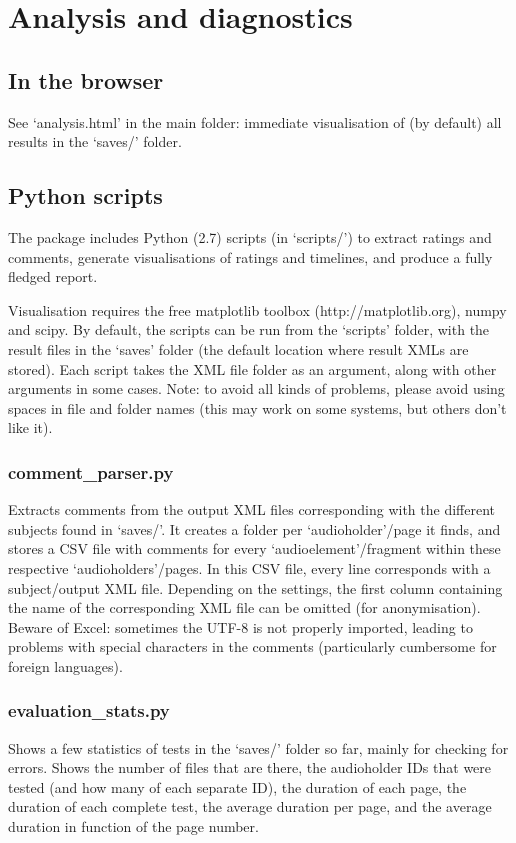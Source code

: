 \documentclass[11pt, oneside]{article}   	%
\begin{document}
\clearpage
\section{Analysis and diagnostics}
	\subsection{In the browser}
		See `analysis.html' in the main folder: immediate visualisation of (by default) all results in the `saves/' folder. 

	\subsection{Python scripts}
		The package includes Python (2.7) scripts (in `scripts/') to extract ratings and comments, generate visualisations of ratings and timelines, and produce a fully fledged report. 

		Visualisation requires the free matplotlib toolbox (http://matplotlib.org), numpy and scipy. 
		By default, the scripts can be run from the `scripts' folder, with the result files in the `saves' folder (the default location where result XMLs are stored). Each script takes the XML file folder as an argument, along with other arguments in some cases.
		Note: to avoid all kinds of problems, please avoid using spaces in file and folder names (this may work on some systems, but others don't like it). 

		\subsubsection{comment\_parser.py}
			Extracts comments from the output XML files corresponding with the different subjects found in `saves/'. It creates a folder per `audioholder'/page it finds, and stores a CSV file with comments for every `audioelement'/fragment within these respective `audioholders'/pages. In this CSV file, every line corresponds with a subject/output XML file. Depending on the settings, the first column containing the name of the corresponding XML file can be omitted (for anonymisation). 
			Beware of Excel: sometimes the UTF-8 is not properly imported, leading to problems with special characters in the comments (particularly cumbersome for foreign languages). 

		\subsubsection{evaluation\_stats.py}
			Shows a few statistics of tests in the `saves/' folder so far, mainly for checking for errors. Shows the number of files that are there, the audioholder IDs that were tested (and how many of each separate ID), the duration of each page, the duration of each complete test, the average duration per page, and the average duration in function of the page number. 
\end{document}
